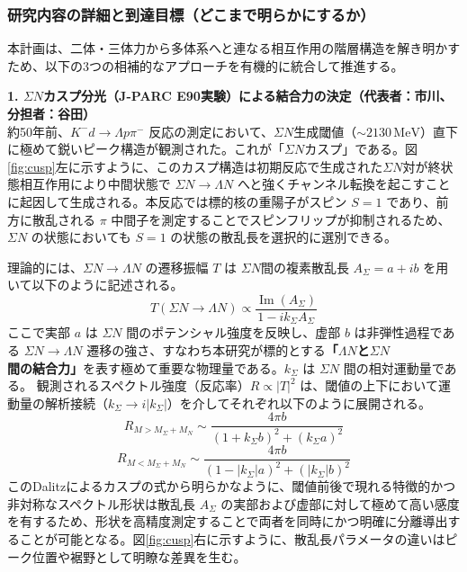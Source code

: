 \documentclass[11pt,a4j,dvipdfmx]{jarticle} 					%
\newcommand{\研究課題名}{加速器実験による短距離バリオン間相互作用の解明と中性子星ハイペロンパズルの解決}
\newcommand{\研究機関名}{東北大学}
\newcommand{\研究代表者氏名}{市川裕大}
\newcommand{\研究期間の最終元号年度}{13}
\begin{document}
\subsubsection{研究内容の詳細と到達目標（どこまで明らかにするか）}
本計画は、二体・三体力から多体系へと連なる相互作用の階層構造を解き明かすため、以下の3つの相補的なアプローチを有機的に統合して推進する。

\vspace*{0.5zw}
\noindent
\textbf{1. $\Sigma N$カスプ分光（J-PARC E90実験）による結合力の決定（代表者：市川、分担者：谷田）}\\
約50年前、$K^- d \to \Lambda p \pi^-$ 反応の測定において、$\Sigma N$生成閾値（$\sim 2130\,\text{MeV}$）直下に極めて鋭いピーク構造が観測された。これが「$\Sigma N$カスプ」である。図\ref{fig:cusp}左に示すように、このカスプ構造は初期反応で生成された$\Sigma N$対が終状態相互作用により中間状態で $\Sigma N \to \Lambda N$ へと強くチャンネル転換を起こすことに起因して生成される。本反応では標的核の重陽子がスピン $S=1$ であり、前方に散乱される $\pi$ 中間子を測定することでスピンフリップが抑制されるため、$\Sigma N$ の状態においても $S=1$ の状態の散乱長を選択的に選別できる。

理論的には、$\Sigma N \to \Lambda N$ の遷移振幅 $T$ は $\Sigma N$間の複素散乱長 $A_\Sigma = a + i b$ を用いて以下のように記述される。
\begin{equation}
    T(\Sigma N \to \Lambda N) \propto \frac{\operatorname{Im}(A_\Sigma)}{1 - i k_\Sigma A_\Sigma}
\end{equation}
ここで実部 $a$ は $\Sigma N$ 間のポテンシャル強度を反映し、虚部 $b$ は非弾性過程である $\Sigma N \to \Lambda N$ 遷移の強さ、すなわち本研究が標的とする\textbf{「$\Lambda N$と$\Sigma N$間の結合力」}を表す極めて重要な物理量である。$k_\Sigma$ は $\Sigma N$ 間の相対運動量である。
観測されるスペクトル強度（反応率）$R \propto |T|^2$ は、閾値の上下において運動量の解析接続（$k_\Sigma \to i|k_\Sigma|$）を介してそれぞれ以下のように展開される。
\begin{equation}
    R_{M > M_\Sigma + M_N} \sim \frac{4\pi b}{(1 + k_\Sigma b)^2 + (k_\Sigma a)^2}
\end{equation}
\begin{equation}
    R_{M < M_\Sigma + M_N} \sim \frac{4\pi b}{(1 - |k_\Sigma| a)^2 + (|k_\Sigma| b)^2}
\end{equation}
このDalitzによるカスプの式から明らかなように、閾値前後で現れる特徴的かつ非対称なスペクトル形状は散乱長 $A_\Sigma$ の実部および虚部に対して極めて高い感度を有するため、形状を高精度測定することで両者を同時にかつ明確に分離導出することが可能となる。図\ref{fig:cusp}右に示すように、散乱長パラメータの違いはピーク位置や裾野として明瞭な差異を生む。
\end{document}
